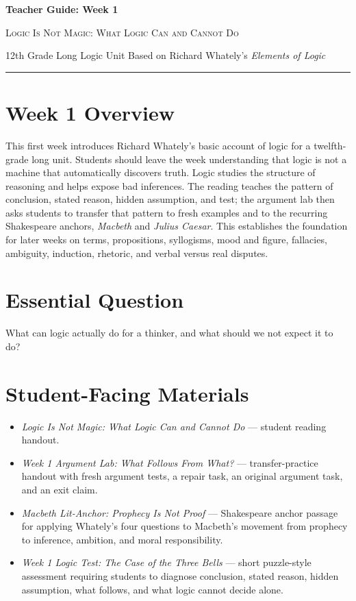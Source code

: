 \documentclass[12pt]{article}
\begin{document}
\begin{center}
{\LARGE\bfseries Teacher Guide: Week 1}\par\vspace{0.25em}
{\large\scshape Logic Is Not Magic: What Logic Can and Cannot Do}\par\vspace{0.4em}
{12th Grade Long Logic Unit Based on Richard Whately's \textit{Elements of Logic}}\par\vspace{0.6em}
\rule{0.82\textwidth}{0.4pt}
\end{center}

\section*{Week 1 Overview}
This first week introduces Richard Whately's basic account of logic for a twelfth-grade long unit. Students should leave the week understanding that logic is not a machine that automatically discovers truth. Logic studies the structure of reasoning and helps expose bad inferences. The reading teaches the pattern of conclusion, stated reason, hidden assumption, and test; the argument lab then asks students to transfer that pattern to fresh examples and to the recurring Shakespeare anchors, \textit{Macbeth} and \textit{Julius Caesar}. This establishes the foundation for later weeks on terms, propositions, syllogisms, mood and figure, fallacies, ambiguity, induction, rhetoric, and verbal versus real disputes.

\section*{Essential Question}
What can logic actually do for a thinker, and what should we not expect it to do?

\section*{Student-Facing Materials}
\begin{itemize}[leftmargin=*]
\item \textit{Logic Is Not Magic: What Logic Can and Cannot Do} — student reading handout.
\item \textit{Week 1 Argument Lab: What Follows From What?} — transfer-practice handout with fresh argument tests, a repair task, an original argument task, and an exit claim.
\item \textit{Macbeth Lit-Anchor: Prophecy Is Not Proof} — Shakespeare anchor passage for applying Whately's four questions to Macbeth's movement from prophecy to inference, ambition, and moral responsibility.
\item \textit{Week 1 Logic Test: The Case of the Three Bells} — short puzzle-style assessment requiring students to diagnose conclusion, stated reason, hidden assumption, what follows, and what logic cannot decide alone.
\end{itemize}
\end{document}
